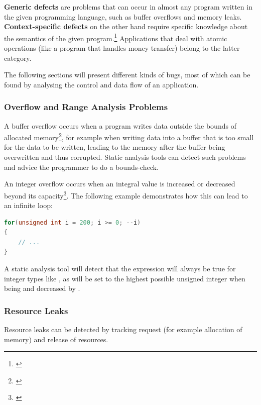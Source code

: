 \textbf{Generic defects} are problems that can occur in almost any program written in the given programming language, such as buffer overflows and memory leaks.\\
\textbf{Context-specific defects} on the other hand require specific knowledge about the semantics of the given program.\footnote{\citep[14]{SecureProgramming}} Applications that deal with atomic operations (like a program that handles money transfer) belong to the latter category.

The following sections will present different kinds of bugs, most of which can be found by analysing the control and data flow of an application.

\subsubsection{Overflow and Range Analysis Problems}

A buffer overflow occurs when a program writes data outside the bounds of allocated memory\footnote{\citep[175]{SecureProgramming}}, for example when writing data into a buffer that is too small for the data to be written, leading to the memory after the buffer being overwritten and thus corrupted. Static analysis tools can detect such problems and advice the programmer to do a bounds-check.

An integer overflow occurs when an integral value is increased or decreased beyond its capacity\footnote{\citep[235]{SecureProgramming}}. The following example demonstrates how this can lead to an infinite loop:

\SingleSpacing
\begin{lstlisting}[language=C++, caption=Integer \mySlang{underflow} in \myProperName{C++}]
for(unsigned int i = 200; i >= 0; --i)
{
	// ...
}
\end{lstlisting}
\OnehalfSpacing

A static analysis tool will detect that the expression  will always be true for  integer types like , as  will be set to the highest possible unsigned integer when being  and decreased by .

\subsubsection{Resource Leaks}

Resource leaks can be detected by tracking request (for example allocation of memory) and release of resources.

